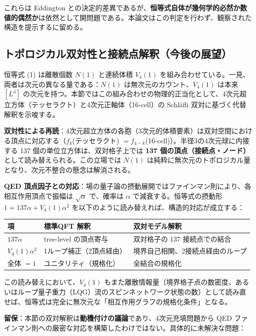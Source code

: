 \documentclass[a4paper,11pt]{ltjsarticle}
\begin{document}
これらは Eddington との決定的差異であるが、\textbf{恒等式自体が幾何学的必然か数値的偶然か}は依然として開問題である。本論文はこの判定を行わず、観察された構造を提示するに留める。

\subsection{トポロジカル双対性と接続点解釈（今後の展望）}

恒等式 (1) は離散個数 $N(1)$ と連続体積 $V_4(1)$ を組み合わせている。一見、両者は次元の異なる量である：$N(1)$ は無次元のカウント、$V_4(1)$ は本来 $[L^4]$ の次元を持つ。本節ではこの組み合わせの物理的正当化として、4次元超立方体（テッセラクト）と4次元正軸体（16-cell）の Schläfli 双対に基づく代替解釈を示唆する。

\textbf{双対性による再読}：4次元超立方体の各胞（3次元的体積要素）は双対空間における頂点に対応する（$f_k$(テッセラクト) $= f_{4-k}$(16-cell)）。半径3の4次元球に内接する 137 個の単位立方体は、双対格子上では \textbf{137 個の頂点（接続点・ノード）} として読み替えられる。この立場では $N(1)$ は純粋に無次元のトポロジカル量となり、次元不整合の懸念は解消される。

\textbf{QED 頂点因子との対応}：場の量子論の摂動展開ではファインマン則により、各相互作用頂点で振幅は $\sqrt{\alpha}$ で、確率は $\alpha$ で減衰する。恒等式の摂動形 $1 = 137\alpha + V_4(1)\alpha^2$ を以下のように読み替えれば、構造的対応が成立する：

\begin{center}
\begin{tabular}{lll}
\toprule
項 & 標準QFT 解釈 & 双対モデル解釈 \\
\midrule
$137\alpha$ & tree-level の頂点寄与 & 双対格子の 137 接続点での結合 \\
$V_4(1)\alpha^2$ & 1ループ補正（2頂点経由） & 境界自己相関、2接続点経由のループ \\
全体 $= 1$ & ユニタリティ（規格化） & 全結合の規格化 \\
\bottomrule
\end{tabular}
\end{center}

この読み替えにおいて、$V_4(1)$ もまた離散情報量（境界格子点の数密度、あるいはループ量子重力（LQG）流のスピンネットワーク状態の数）として読み直せば、恒等式は完全に無次元な「相互作用グラフの規格化条件」となる。

\textbf{留保}：本節の双対解釈は\textbf{動機付けの議論}であり、4次元充填問題から QED ファインマン則への厳密な対応を構築したわけではない。具体的に未解決な問題：
\end{document}

